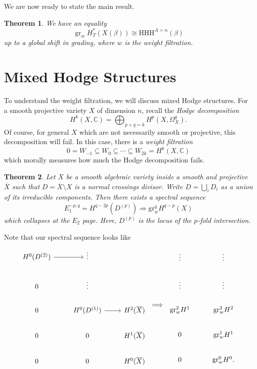 \documentclass[leqno, openany]{memoir}
\newtheorem{thm}{Theorem}[section]
\theoremstyle{definition}
\theoremstyle{remark}
\theoremstyle{plain}
\theoremstyle{definition}
\theoremstyle{remark}
\newcommand{\C}{\mathbb{C}}
\newcommand{\mr}[1]{\mathrm{#1}}
\newcommand{\ol}[1]{\overline{#1}}
\newcommand{\1}{\mathbf{1}}
\newcommand{\2}{\mathbf{2}}
\newcommand{\3}{\mathbf{3}}
\begin{document}
We are now ready to state the main result.
\begin{thm}
    We have an equality
    \[ \operatorname{gr}_w H_T^*(X(\beta)) \cong \mr{HHH}^{A=n}(\beta) \]
    up to a global shift in grading, where $w$ is the weight filtration.
\end{thm}

\section{Mixed Hodge Structures}%
\label{sec:mixed_hodge_structures}

To understand the weight filtration, we will discuss mixed Hodge structures. For a smooth projective variety $X$ of dimension $n$, recall the \textit{Hodge decomposition}
\[ H^k(X, \C) = \bigoplus_{p+q=k} H^p(X, \Omega^q_X). \]
Of course, for general $X$ which are not necessarily smooth or projective, this decomposition will fail. In this case, there is a \textit{weight filtration}
\[ 0 = W_{-1} \subseteq W_0 \subseteq \cdots \subseteq W_{2k} = H^k(X, \C) \]
which morally measures how much the Hodge decomposition fails.

\begin{thm}
    Let $X$ be a smooth algebraic variety inside a smooth and projective $\ol{X}$ such that $D = \ol{X} \setminus X$ is a normal crossings divisor. Write $D = \bigcup_i D_i$ as a union of its irreducible components. Then there exists a spectral sequence
    \[ E_1^{-p,q} = H^{q-2p}(D^{(p)}) \Rightarrow \mr{gr}_w^q H^{q-p}(X) \]
    which collapses at the $E_2$ page. Here, $D^{(p)}$ is the locus of the $p$-fold intersection.
\end{thm}

Note that our spectral sequence looks like
\begin{equation*}
\begin{tikzcd}
    H^0(D^{(2)}) \ar{r} & \vdots \\
    0 & \vdots \\
    0 & H^0(D^{(1)}) \ar{r} & H^2(\ol{X}) \\
    0 & 0 & H^1(\ol{X}) \\
    0 & 0 & H^0(\ol{X})
\end{tikzcd} \implies
    \begin{tikzcd}
        \vdots & \vdots \\
        \vdots & \vdots \\
        \mr{gr}_w^2 H^1 & \mr{gr}_w^2 H^2 \\
        0 & \mr{gr}_w^1 H^1 \\
        0 & \mr{gr}_w^0 H^0.
    \end{tikzcd}
\end{equation*}
\end{document}
